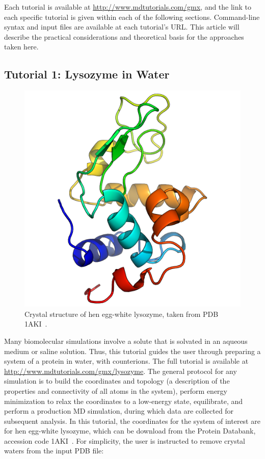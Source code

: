 \documentclass[9pt,tutorial]{livecoms}
\newcommand{\urlstring}{http://www.mdtutorials.com/gmx}
\newcommand{\tutorialhomeurl}{\url{\urlstring}}
\newcommand{\tutoriallyso}{\url{\urlstring/lysozyme}}
\begin{document}
Each tutorial is available at \tutorialhomeurl, and the link to each specific tutorial is given within each of the following sections. Command-line syntax and input files are available at each tutorial's URL. This article will describe the practical considerations and theoretical basis for the approaches taken here.

\subsection{Tutorial 1: Lysozyme in Water} \label{lyso}

\begin{figure}[H]
\centering
\includegraphics{lysozyme_1aki}
\caption{Crystal structure of hen egg-white lysozyme, taken from PDB 1AKI~\cite{Artymiuk1982}.}
\label{lyso_xtal_fig}
\end{figure}

Many biomolecular simulations involve a solute that is solvated in an aqueous medium or saline solution. Thus, this tutorial guides the user through preparing a system of a protein in water, with counterions. The full tutorial is available at \tutoriallyso. The general protocol for any simulation is to build the coordinates and topology (a description of the properties and connectivity of all atoms in the system), perform energy minimization to relax the coordinates to a low-energy state, equilibrate, and perform a production MD simulation, during which data are collected for subsequent analysis. In this tutorial, the coordinates for the system of interest are for hen egg-white lysozyme, which can be download from the Protein Databank, accession code 1AKI~\cite{Artymiuk1982}. For simplicity, the user is instructed to remove crystal waters from the input PDB file:
\end{document}
